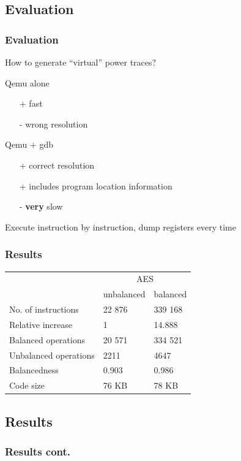 \documentclass[11pt,t,usepdftitle=false,aspectratio=169]{beamer}
\begin{document}
\subsection{Evaluation}
\begin{frame}
  \frametitle{Evaluation}

  How to generate ``virtual'' power traces?
  
  \begin{alertblock}{Qemu alone}
    \begin{itemize}
    \item[+] fast
    \item[-] wrong resolution
    \end{itemize}
  \end{alertblock}

  \begin{block}{Qemu + gdb}
    \begin{itemize}
    \item[+] correct resolution
    \item[+] includes program location information
    \item[-] \textbf{very} slow
    \end{itemize}
    Execute instruction by instruction, dump registers every time
  \end{block}
\end{frame}

\begin{frame}
  \frametitle{Results}
  \center
  \vfill
  \begin{tabular}{|l|l|l|}
    \hline
    & \multicolumn{2}{c|}{AES} \\
    \cline{2-3}
    & unbalanced & balanced \\
    \cline{2-3}
    No. of instructions & 22 876 & 339 168 \\
    Relative increase & 1 & 14.888 \\
    Balanced operations & 20 571 & 334 521 \\
    Unbalanced operations & 2211 & 4647 \\
    Balancedness      & 0.903 & 0.986 \\
    Code size         & 76 KB & 78 KB \\
    \hline
  \end{tabular}
  \vfill
\end{frame}

\subsection{Results}
\begin{frame}
  \frametitle{Results cont.}

\end{frame}
\end{document}
